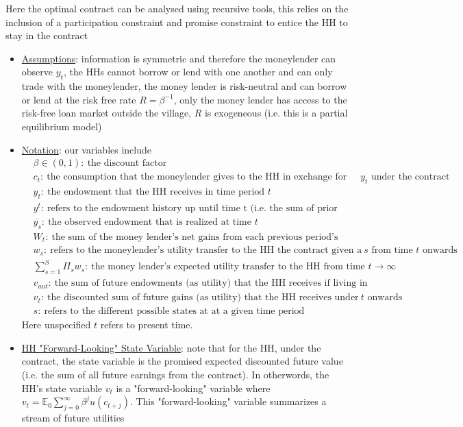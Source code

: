\documentclass{article}
\begin{document}
Here the optimal contract can be analysed using recursive tools, this relies on the inclusion of a participation constraint and promise constraint to entice the HH to stay in the contract
\begin{itemize}
    \item  \underline{Assumptions}: information is symmetric and therefore the moneylender can observe $y_{t}$, the HHs cannot borrow or lend with one another and can only trade with the moneylender, the money lender is risk-neutral and can borrow or lend at the risk free rate $R = \beta^{-1}$, only the money lender has access to the risk-free loan market outside the village, $R$ is exogeneous (i.e. this is a partial equilibrium model)
    \item  \underline{Notation}: our variables include
    \begin{align*}
    &\beta \in (0,1): \ \text{the discount factor} \\
    &c_{t}:\ \text{the consumption that the moneylender gives to the HH in exchange for the endowment $y_{t}$ under the contract} \\
    &y_{t}:\ \text{the endowment that the HH receives in time period $t$} \\
    &y^{t}:\ \text{refers to the endowment history up until time t (i.e. the sum of prior endowments)} \\
    &\overline{y_{s}}: \ \text{the observed endowment that is realized at time $t$} \\
    &W_{t}: \ \text{the sum of the money lender's net gains from each previous period's contract up until time t} \\
    &w_{s}: \ \text{refers to the moneylender's utility transfer to the HH the contract given a particular future state $s$ from time $t$ onwards} \\
    &\text{$\sum_{s=1}^{S}$} \Pi_{s} w_{s}: \ \text{the money lender's expected utility transfer to the HH from time $t \rightarrow \infty$} \\
    &v_{aut}: \ \text{the sum of future endowments (as utility) that the HH receives if living in autarky} \\
    &v_{t}: \ \text{the discounted sum of future gains (as utility) that the HH receives under the contract from time $t$ onwards} \\
    &s: \ \text{refers to the different possible states at at a given time period}
\end{align*}
    Here unspecified $t$ refers to present time.
    \item  \underline{HH "Forward-Looking" State Variable}: note that for the HH, under the contract, the state variable is the promised expected discounted future value (i.e. the sum of all future earnings from the contract). In otherwords, the HH's state variable $v_{t}$ is a "forward-looking" variable where  $v_{t} = \mathbb{E}_{0} \sum_{j=0}^{\infty} \beta^{j} u(c_{t+j})$. This "forward-looking" variable summarizes a stream of future utilities

\end{itemize}
\end{document}
